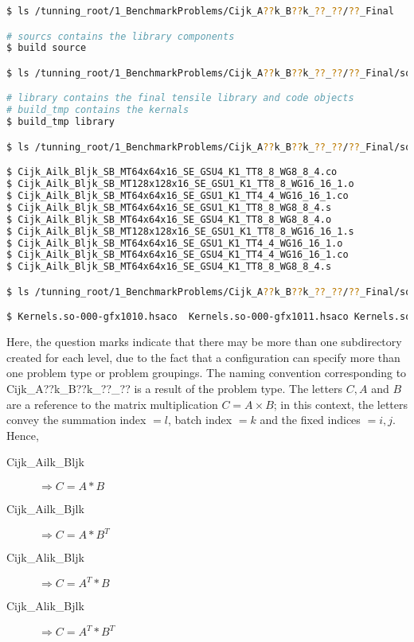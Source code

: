 \documentclass[]{article}
\begin{document}
\begin{lstlisting}[language=bash,breaklines=true, emph={build,ls,build_tmp,library}, emphstyle=\color{blue}]
$ ls /tunning_root/1_BenchmarkProblems/Cijk_A??k_B??k_??_??/??_Final

# sourcs contains the library components
$ build source

$ ls /tunning_root/1_BenchmarkProblems/Cijk_A??k_B??k_??_??/??_Final/source

# library contains the final tensile library and code objects
# build_tmp contains the kernals
$ build_tmp library

$ ls /tunning_root/1_BenchmarkProblems/Cijk_A??k_B??k_??_??/??_Final/source/build_tmp/SOURCETMP/assembly

$ Cijk_Ailk_Bljk_SB_MT64x64x16_SE_GSU4_K1_TT8_8_WG8_8_4.co
$ Cijk_Ailk_Bljk_SB_MT128x128x16_SE_GSU1_K1_TT8_8_WG16_16_1.o
$ Cijk_Ailk_Bljk_SB_MT64x64x16_SE_GSU1_K1_TT4_4_WG16_16_1.co
$ Cijk_Ailk_Bljk_SB_MT64x64x16_SE_GSU1_K1_TT8_8_WG8_8_4.s
$ Cijk_Ailk_Bljk_SB_MT64x64x16_SE_GSU4_K1_TT8_8_WG8_8_4.o
$ Cijk_Ailk_Bljk_SB_MT128x128x16_SE_GSU1_K1_TT8_8_WG16_16_1.s
$ Cijk_Ailk_Bljk_SB_MT64x64x16_SE_GSU1_K1_TT4_4_WG16_16_1.o
$ Cijk_Ailk_Bljk_SB_MT64x64x16_SE_GSU4_K1_TT4_4_WG16_16_1.co
$ Cijk_Ailk_Bljk_SB_MT64x64x16_SE_GSU4_K1_TT8_8_WG8_8_4.s

$ ls /tunning_root/1_BenchmarkProblems/Cijk_A??k_B??k_??_??/??_Final/source/library

$ Kernels.so-000-gfx1010.hsaco  Kernels.so-000-gfx1011.hsaco Kernels.so-000-gfx803.hsaco Kernels.so-000-gfx900.hsaco Kernels.so-000-gfx906.hsaco  Kernels.so-000-gfx908.hsaco TensileLibrary_gfx906.co TensileLibrary.yaml

\end{lstlisting}

\noindent
Here, the question marks indicate that there may be more than one subdirectory created for each level, due to the fact that a configuration can specify more than one problem type or problem groupings. The naming convention corresponding to Cijk\_A??k\_B??k\_??\_?? is a result of the problem type. The letters $ C, A $ and $ B $ are a reference to the matrix multiplication $ C = A \times B $; in this context, the letters convey the summation index $= l$, batch index $= k$ and the fixed indices $=i,j$. Hence,

\begin{description}
	\item[Cijk\_Ailk\_Bljk]  $ \Longrightarrow C = A * B $
	\item[Cijk\_Ailk\_Bjlk]  $ \Longrightarrow C = A * B^T $
	\item[Cijk\_Alik\_Bljk]  $ \Longrightarrow C = A^T * B $
	\item[Cijk\_Alik\_Bjlk]  $ \Longrightarrow C = A^T * B^T $
\end{description}
\end{document}
